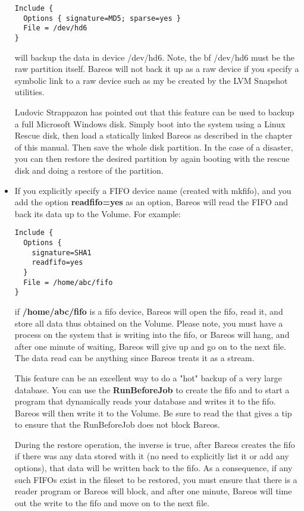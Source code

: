 \begin{itemize}
\footnotesize
\begin{verbatim}
Include {
  Options { signature=MD5; sparse=yes }
  File = /dev/hd6
}
\end{verbatim}
\normalsize

   will backup the data in device /dev/hd6. Note, the {bf /dev/hd6} must be
   the raw partition itself. Bareos will not back it up as a raw device if
   you specify a symbolic link to a raw device such as my be created by the
   LVM Snapshot utilities.

   Ludovic Strappazon has pointed out that this feature can be  used to backup a
   full Microsoft Windows disk. Simply boot into  the system using a Linux Rescue
   disk, then load a statically  linked Bareos as described in the
    chapter of
   this manual. Then  save the whole disk partition. In the case of a disaster,
   you  can then restore the desired partition by again booting with  the rescue
   disk and doing a restore of the partition.
   \item If you explicitly specify a FIFO device name (created with mkfifo),  and
   you add the option {\bf readfifo=yes} as an option, Bareos  will read the FIFO
   and back its data up to the Volume. For  example:

\footnotesize
\begin{verbatim}
Include {
  Options {
    signature=SHA1
    readfifo=yes
  }
  File = /home/abc/fifo
}
\end{verbatim}
\normalsize

   if {\bf /home/abc/fifo} is a fifo device, Bareos will open the fifo,
   read it, and store all data thus obtained on the Volume.  Please note,
   you must have a process on the system that is writing into the fifo, or
   Bareos will hang, and after one minute of waiting, Bareos will give up
   and go on to the next file.  The data read can be anything since Bareos
   treats it as a stream.

   This feature can be an excellent way to do a "hot" backup of a very
   large database.  You can use the {\bf RunBeforeJob} to create the fifo
   and to start a program that dynamically reads your database and writes
   it to the fifo.  Bareos will then write it to the Volume.  Be sure to
   read the  that gives a
   tip to ensure that the RunBeforeJob does not block Bareos.

   During the restore operation, the inverse is true, after Bareos creates
   the fifo if there was any data stored with it (no need to explicitly
   list it or add any options), that data will be written back to the fifo.
   As a consequence, if any such FIFOs exist in the fileset to be restored,
   you must ensure that there is a reader program or Bareos will block, and
   after one minute, Bareos will time out the write to the fifo and move on
   to the next file.


\end{itemize}

